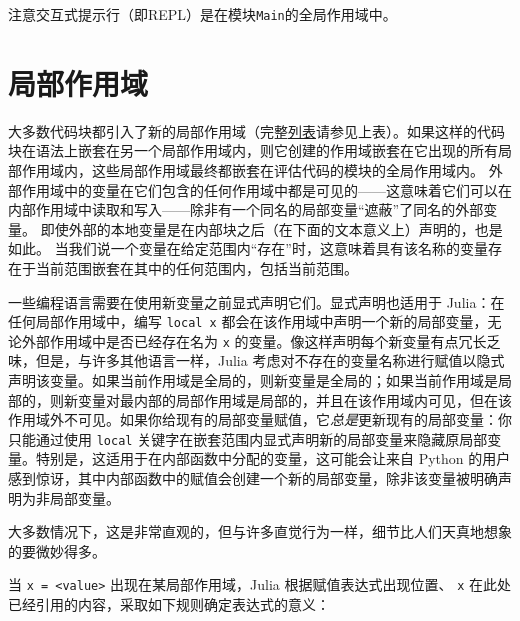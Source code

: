 注意交互式提示行（即REPL）是在模块\texttt{Main}的全局作用域中。



\hypertarget{8604224695833880734}{}


\section{局部作用域}



大多数代码块都引入了新的局部作用域（完整\hyperlink{8072811582823893323}{列表}请参见上表）。如果这样的代码块在语法上嵌套在另一个局部作用域内，则它创建的作用域嵌套在它出现的所有局部作用域内，这些局部作用域最终都嵌套在评估代码的模块的全局作用域内。 外部作用域中的变量在它们包含的任何作用域中都是可见的——这意味着它们可以在内部作用域中读取和写入——除非有一个同名的局部变量“遮蔽”了同名的外部变量。 即使外部的本地变量是在内部块之后（在下面的文本意义上）声明的，也是如此。 当我们说一个变量在给定范围内“存在”时，这意味着具有该名称的变量存在于当前范围嵌套在其中的任何范围内，包括当前范围。



一些编程语言需要在使用新变量之前显式声明它们。显式声明也适用于 Julia：在任何局部作用域中，编写 \texttt{local x} 都会在该作用域中声明一个新的局部变量，无论外部作用域中是否已经存在名为 \texttt{x} 的变量。像这样声明每个新变量有点冗长乏味，但是，与许多其他语言一样，Julia 考虑对不存在的变量名称进行赋值以隐式声明该变量。如果当前作用域是全局的，则新变量是全局的；如果当前作用域是局部的，则新变量对最内部的局部作用域是局部的，并且在该作用域内可见，但在该作用域外不可见。如果你给现有的局部变量赋值，它\emph{总是}更新现有的局部变量：你只能通过使用 \texttt{local} 关键字在嵌套范围内显式声明新的局部变量来隐藏原局部变量。特别是，这适用于在内部函数中分配的变量，这可能会让来自 Python 的用户感到惊讶，其中内部函数中的赋值会创建一个新的局部变量，除非该变量被明确声明为非局部变量。



大多数情况下，这是非常直观的，但与许多直觉行为一样，细节比人们天真地想象的要微妙得多。



当 \texttt{x = <value>} 出现在某局部作用域，Julia 根据赋值表达式出现位置、 \texttt{x} 在此处已经引用的内容，采取如下规则确定表达式的意义：



